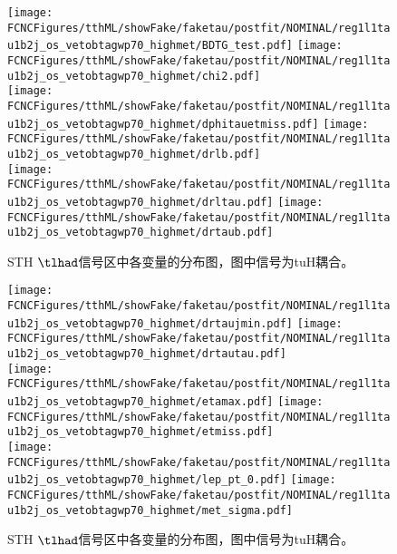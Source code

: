 \begin{figure}[H]
\centering
\texttt{[image: \\FCNCFigures/tthML/showFake/faketau/postfit/NOMINAL/reg1l1tau1b2j\_os\_vetobtagwp70\_highmet/BDTG\_test.pdf]}
\texttt{[image: \\FCNCFigures/tthML/showFake/faketau/postfit/NOMINAL/reg1l1tau1b2j\_os\_vetobtagwp70\_highmet/chi2.pdf]}
\\
\texttt{[image: \\FCNCFigures/tthML/showFake/faketau/postfit/NOMINAL/reg1l1tau1b2j\_os\_vetobtagwp70\_highmet/dphitauetmiss.pdf]}
\texttt{[image: \\FCNCFigures/tthML/showFake/faketau/postfit/NOMINAL/reg1l1tau1b2j\_os\_vetobtagwp70\_highmet/drlb.pdf]}
\\
\texttt{[image: \\FCNCFigures/tthML/showFake/faketau/postfit/NOMINAL/reg1l1tau1b2j\_os\_vetobtagwp70\_highmet/drltau.pdf]}
\texttt{[image: \\FCNCFigures/tthML/showFake/faketau/postfit/NOMINAL/reg1l1tau1b2j\_os\_vetobtagwp70\_highmet/drtaub.pdf]}
\\
\caption{STH $\tlhad$信号区中各变量的分布图，图中信号为tuH耦合。}
\label{fig:var_reg1l1tau1b2j_os_vetobtagwp70_highmet_1}
\end{figure}
\begin{figure}[H]
\centering
\texttt{[image: \\FCNCFigures/tthML/showFake/faketau/postfit/NOMINAL/reg1l1tau1b2j\_os\_vetobtagwp70\_highmet/drtaujmin.pdf]}
\texttt{[image: \\FCNCFigures/tthML/showFake/faketau/postfit/NOMINAL/reg1l1tau1b2j\_os\_vetobtagwp70\_highmet/drtautau.pdf]}
\\
\texttt{[image: \\FCNCFigures/tthML/showFake/faketau/postfit/NOMINAL/reg1l1tau1b2j\_os\_vetobtagwp70\_highmet/etamax.pdf]}
\texttt{[image: \\FCNCFigures/tthML/showFake/faketau/postfit/NOMINAL/reg1l1tau1b2j\_os\_vetobtagwp70\_highmet/etmiss.pdf]}
\\
\texttt{[image: \\FCNCFigures/tthML/showFake/faketau/postfit/NOMINAL/reg1l1tau1b2j\_os\_vetobtagwp70\_highmet/lep\_pt\_0.pdf]}
\texttt{[image: \\FCNCFigures/tthML/showFake/faketau/postfit/NOMINAL/reg1l1tau1b2j\_os\_vetobtagwp70\_highmet/met\_sigma.pdf]}
\\
\caption{STH $\tlhad$信号区中各变量的分布图，图中信号为tuH耦合。}
\label{fig:var_reg1l1tau1b2j_os_vetobtagwp70_highmet_2}
\end{figure}
